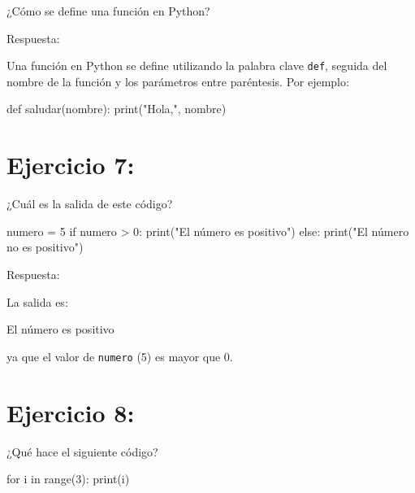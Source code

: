 \documentclass[
  a4paper,
  DIV=11,
  numbers=noendperiod,
  onepage,
  openany]{scrreprt}
\newenvironment{Shaded}{\begin{snugshade}}{\end{snugshade}}
\newcommand{\BuiltInTok}[1]{\textcolor[rgb]{0.00,0.23,0.31}{#1}}
\newcommand{\ControlFlowTok}[1]{\textcolor[rgb]{0.00,0.23,0.31}{#1}}
\newcommand{\DecValTok}[1]{\textcolor[rgb]{0.68,0.00,0.00}{#1}}
\newcommand{\ExtensionTok}[1]{\textcolor[rgb]{0.00,0.23,0.31}{#1}}
\newcommand{\KeywordTok}[1]{\textcolor[rgb]{0.00,0.23,0.31}{#1}}
\newcommand{\NormalTok}[1]{\textcolor[rgb]{0.00,0.23,0.31}{#1}}
\newcommand{\OperatorTok}[1]{\textcolor[rgb]{0.37,0.37,0.37}{#1}}
\newcommand{\StringTok}[1]{\textcolor[rgb]{0.13,0.47,0.30}{#1}}
\begin{document}
¿Cómo se define una función en Python?

Respuesta:

Una función en Python se define utilizando la palabra clave
\texttt{def}, seguida del nombre de la función y los parámetros entre
paréntesis. Por ejemplo:

\begin{Shaded}
\begin{Highlighting}[]
\KeywordTok{def}\NormalTok{ saludar(nombre):}
    \BuiltInTok{print}\NormalTok{(}\StringTok{"Hola,"}\NormalTok{, nombre)}
\end{Highlighting}
\end{Shaded}

\chapter{Ejercicio 7:}\label{ejercicio-7}

¿Cuál es la salida de este código?

\begin{Shaded}
\begin{Highlighting}[]
\NormalTok{numero }\OperatorTok{=} \DecValTok{5}
\ControlFlowTok{if}\NormalTok{ numero }\OperatorTok{\textgreater{}} \DecValTok{0}\NormalTok{:}
    \BuiltInTok{print}\NormalTok{(}\StringTok{"El número es positivo"}\NormalTok{)}
\ControlFlowTok{else}\NormalTok{:}
    \BuiltInTok{print}\NormalTok{(}\StringTok{"El número no es positivo"}\NormalTok{)}
\end{Highlighting}
\end{Shaded}

Respuesta:

La salida es:

\begin{Shaded}
\begin{Highlighting}[]
\ExtensionTok{El}\NormalTok{ número es positivo}
\end{Highlighting}
\end{Shaded}

ya que el valor de \texttt{numero} (5) es mayor que 0.

\chapter{Ejercicio 8:}\label{ejercicio-8}

¿Qué hace el siguiente código?

\begin{Shaded}
\begin{Highlighting}[]
\ControlFlowTok{for}\NormalTok{ i }\KeywordTok{in} \BuiltInTok{range}\NormalTok{(}\DecValTok{3}\NormalTok{):}
    \BuiltInTok{print}\NormalTok{(i)}
\end{Highlighting}
\end{Shaded}
\end{document}
